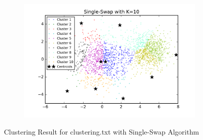 \begin{description}
\begin{description}
\begin{figure}[!h]
\begin{subfigure}[b]{0.475\textwidth}
        \end{subfigure}
        \hfill
        \begin{subfigure}[b]{0.475\textwidth}   
            \centering 
            \includegraphics[width=\textwidth]{./figures/clustering_singleSwap_10.png}
        \end{subfigure}
        
        \caption{Clustering Result for clustering.txt with Single-Swap Algorithm}
        \label{fig:single-swap-clusterimg}
\end{figure}


\end{description}
\end{description}
